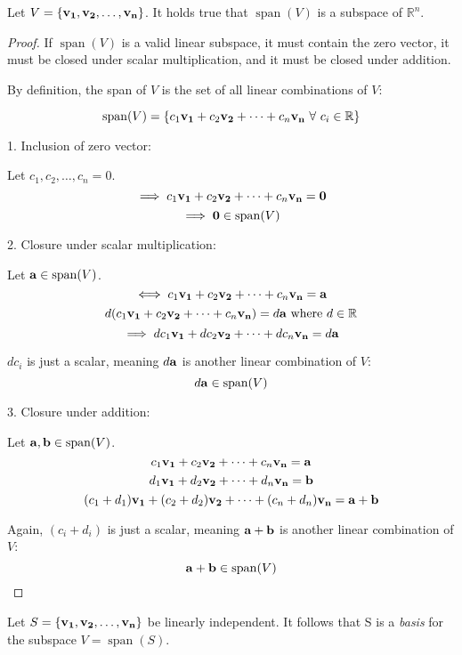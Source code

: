 \documentclass[../main.tex]{subfiles}
\begin{document}
\begin{theorem}
	Let $V=\{ \mathbf{v_1}, \mathbf{v_2}, \ldots , \mathbf{v_n} \}$. It holds true that
	$\operatorname{span}(V)$ is a subspace of $\mathbb{R}^n$.
\end{theorem}

\begin{proof}
	If $\operatorname{span}(V)$ is a valid linear subspace, it must contain the zero vector,
	it must be closed under scalar multiplication, and it must be closed
	under addition.

	By definition, the span of $V$ is the set of all linear combinations of $V$:

	\begin{equation}
		\operatorname{span}(V)=\{ c_1\mathbf{v_1} + c_2\mathbf{v_2} + \dots + c_n\mathbf{v_n}\ \forall\ c_i \in \mathbb{R} \}
	\end{equation}

	1. Inclusion of zero vector:

	\begin{center}
		Let $c_1, c_2, \ldots , c_n=0$.
		$$\implies c_1\mathbf{v_1} + c_2\mathbf{v_2} + \dots + c_n\mathbf{v_n}=\mathbf{0}$$
		$$\implies \mathbf{0} \in \operatorname{span}(V)$$
	\end{center}

	2. Closure under scalar multiplication:

	\begin{center}
		Let $\mathbf{a} \in \operatorname{span}(V)$.
		$$\iff c_1\mathbf{v_1} + c_2\mathbf{v_2} + \dots + c_n\mathbf{v_n}=\mathbf{a}$$
		$$d(c_1\mathbf{v_1} + c_2\mathbf{v_2} + \dots + c_n\mathbf{v_n})=d\mathbf{a}\ \textnormal{where}\ d \in \mathbb{R}$$
		$$\implies dc_1\mathbf{v_1} + dc_2\mathbf{v_2} + \dots + dc_n\mathbf{v_n}=d\mathbf{a}$$
	\end{center}

	$dc_i$ is just a scalar, meaning $d\mathbf{a}$ is another
	linear combination of $V$:
	$$d\mathbf{a} \in \operatorname{span}(V)$$

	3. Closure under addition:

	\begin{center}
		Let $\mathbf{a}, \mathbf{b} \in \operatorname{span}(V)$.
		$$c_1\mathbf{v_1} + c_2\mathbf{v_2} + \dots + c_n\mathbf{v_n} = \mathbf{a}$$
		$$d_1\mathbf{v_1} + d_2\mathbf{v_2} + \dots + d_n\mathbf{v_n} = \mathbf{b}$$
		$$(c_1+d_1)\mathbf{v_1} + (c_2+d_2)\mathbf{v_2} + \dots + (c_n+d_n)\mathbf{v_n} = \mathbf{a} + \mathbf{b}$$
	\end{center}

	Again, $(c_i+d_i)$ is just a scalar, meaning $\mathbf{a}+\mathbf{b}$ is another linear combination of $V$:
	$$\mathbf{a}+\mathbf{b} \in \operatorname{span}(V)$$
\end{proof}

\begin{definition}[Basis]
	Let $S = \{ \mathbf{v_1}, \mathbf{v_2}, \ldots , \mathbf{v_n} \}$ be linearly independent.
	It follows that S is a \textit{basis} for the subspace $V = \operatorname{span}(S)$.
\end{definition}
\end{document}
